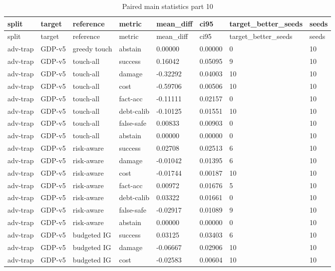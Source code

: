 \documentclass{article}
\begin{document}
\begin{center}
\tiny
\renewcommand{\arraystretch}{0.92}
\setlength{\tabcolsep}{3pt}
\begin{longtable}{llllllll}
\caption{Paired main statistics part 10}\label{tab:paired-main-statistics-10}\\
\toprule
split & target & reference & metric & mean\_diff & ci95 & target\_better\_seeds & seeds \\
\midrule
\endfirsthead
\toprule
split & target & reference & metric & mean\_diff & ci95 & target\_better\_seeds & seeds \\
\midrule
\endhead
adv-trap & GDP-v5 & greedy touch & abstain & 0.00000 & 0.00000 & 0 & 10 \\
adv-trap & GDP-v5 & touch-all & success & 0.16042 & 0.05095 & 9 & 10 \\
adv-trap & GDP-v5 & touch-all & damage & -0.32292 & 0.04003 & 10 & 10 \\
adv-trap & GDP-v5 & touch-all & cost & -0.59706 & 0.00506 & 10 & 10 \\
adv-trap & GDP-v5 & touch-all & fact-acc & -0.11111 & 0.02157 & 0 & 10 \\
adv-trap & GDP-v5 & touch-all & debt-calib & -0.10125 & 0.01551 & 10 & 10 \\
adv-trap & GDP-v5 & touch-all & false-safe & 0.00833 & 0.00903 & 0 & 10 \\
adv-trap & GDP-v5 & touch-all & abstain & 0.00000 & 0.00000 & 0 & 10 \\
adv-trap & GDP-v5 & risk-aware & success & 0.02708 & 0.02513 & 6 & 10 \\
adv-trap & GDP-v5 & risk-aware & damage & -0.01042 & 0.01395 & 6 & 10 \\
adv-trap & GDP-v5 & risk-aware & cost & -0.01744 & 0.00187 & 10 & 10 \\
adv-trap & GDP-v5 & risk-aware & fact-acc & 0.00972 & 0.01676 & 5 & 10 \\
adv-trap & GDP-v5 & risk-aware & debt-calib & 0.03322 & 0.01661 & 0 & 10 \\
adv-trap & GDP-v5 & risk-aware & false-safe & -0.02917 & 0.01089 & 9 & 10 \\
adv-trap & GDP-v5 & risk-aware & abstain & 0.00000 & 0.00000 & 0 & 10 \\
adv-trap & GDP-v5 & budgeted IG & success & 0.03125 & 0.03403 & 6 & 10 \\
adv-trap & GDP-v5 & budgeted IG & damage & -0.06667 & 0.02906 & 10 & 10 \\
adv-trap & GDP-v5 & budgeted IG & cost & -0.02583 & 0.00604 & 10 & 10 \\

\end{longtable}
\end{center}
\end{document}
